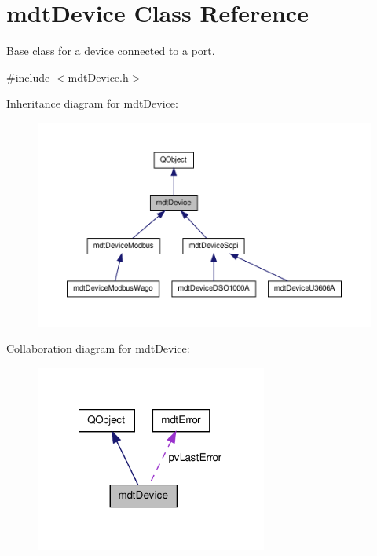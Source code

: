 \hypertarget{classmdt_device}{\section{mdt\-Device Class Reference}
\label{classmdt_device}
}


Base class for a device connected to a port.  




{\ttfamily \#include $<$mdt\-Device.\-h$>$}



Inheritance diagram for mdt\-Device\-:\nopagebreak
\begin{figure}[H]
\begin{center}
\leavevmode
\includegraphics[width=350pt]{classmdt_device__inherit__graph}
\end{center}
\end{figure}


Collaboration diagram for mdt\-Device\-:
\nopagebreak
\begin{figure}[H]
\begin{center}
\leavevmode
\includegraphics[width=216pt]{classmdt_device__coll__graph}
\end{center}
\end{figure}
